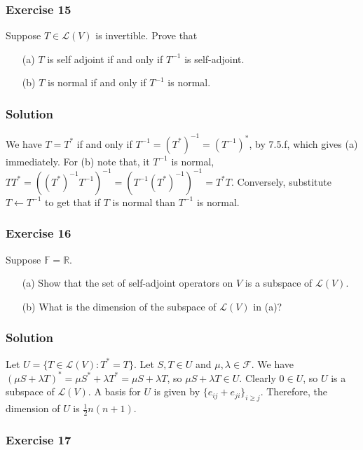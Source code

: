 \subsubsection*{Exercise 15}

Suppose $T \in \mathcal{L}(V)$ is invertible. Prove that
\begin{itemize}
\item[(a)] $T$ is self adjoint if and only if $T^{-1}$ is self-adjoint.
\item[(b)] $T$ is normal if and only if $T^{-1}$ is normal.
\end{itemize}

\subsubsection*{Solution}

We have $T = T^*$ if and only if $T^{-1} = (T^*)^{-1} = (T^{-1})^*$, by 7.5.f, which gives (a) immediately.
For (b) note that, it $T^{-1}$ is normal, $TT^* = ((T^*)^{-1}T^{-1})^{-1} = (T^{-1}(T^*)^{-1})^{-1} = T^*T$.
Conversely, substitute $T \leftarrow T^{-1}$ to get that if $T$ is normal than $T^{-1}$ is normal.


\subsubsection*{Exercise 16}

Suppose $\mathbb{F} = \mathbb{R}$.
\begin{itemize}
\item[(a)] Show that the set of self-adjoint operators on $V$ is a subspace of $\mathcal{L}(V)$.
\item[(b)] What is the dimension of the subspace of $\mathcal{L}(V)$ in (a)?
\end{itemize}

\subsubsection*{Solution}

Let $U = \{ T \in \mathcal{L}(V) : T^* = T \}$.
Let $S, T \in U$ and $\mu, \lambda \in \mathcal{F}$.
We have $(\mu S + \lambda T)^* = \mu S^* + \lambda T^* = \mu S + \lambda T$, so $\mu S + \lambda T \in U$.
Clearly $0 \in U$, so $U$ is a subspace of $\mathcal{L}(V)$.
A basis for $U$ is given by $\{e_{ij} + e_{ji}\}_{i \geq j}$.
Therefore, the dimension of $U$ is $\frac{1}{2}n(n+1)$.


\subsubsection*{Exercise 17}

